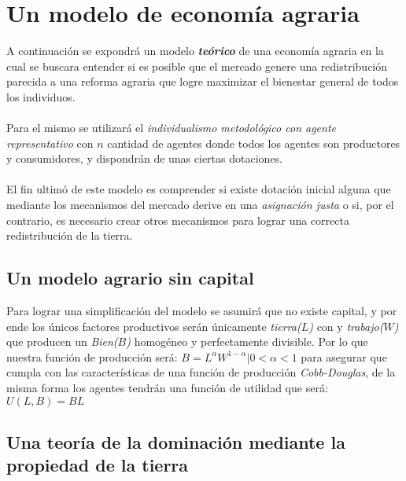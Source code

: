 \documentclass[11pt]{article}
\begin{document}
{\section{Un modelo de economía agraria}

\begin{flushleft}
    A continuación se expondrá un modelo \textit{\textbf{teórico}} de una economía agraria en la cual se buscara entender si es posible
    que el mercado genere una redistribución parecida a una reforma agraria que logre maximizar el bienestar general de todos los individuos.
    \\~\\
    Para el mismo se utilizará el \textit{individualismo metodológico con agente representativo} con $n$ cantidad de agentes
    donde todos los agentes son productores y consumidores, y dispondrán de unas ciertas dotaciones.
    \\~\\
    El fin ultimó de este modelo es comprender si existe dotación inicial alguna que mediante los mecanismos del mercado derive
    en una \textit{asignación justa} o si, por el contrario, es necesario crear otros mecanismos para lograr una correcta redistribución de la tierra.\end{flushleft}

\subsection{Un modelo agrario sin capital}

\begin{flushleft}
    Para lograr una simplificación del modelo se asumirá que no existe capital, y por ende los únicos factores productivos
    serán únicamente \textit{tierra($L$)} con y \textit{trabajo($W$)} que producen un \textit{Bien($B$)} homogéneo y perfectamente divisible.
    Por lo que nuestra función de producción será: $B=L^\alpha W^{1-\alpha}|0<\alpha<1$ para asegurar que cumpla con las 
    características de una función de producción \textit{Cobb-Douglas}, de la misma forma los agentes tendrán una función
    de utilidad que será: $U(L,B)=BL$
\end{flushleft}

\subsection{Una teoría de la dominación mediante la propiedad de la tierra}

}
\end{document}
